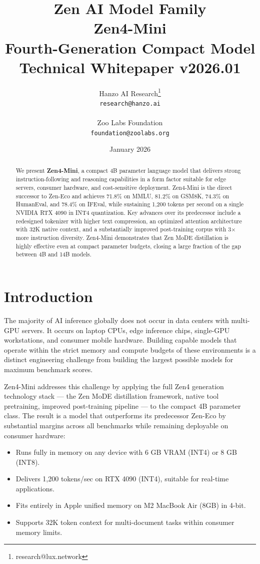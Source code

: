\documentclass[11pt,a4paper]{article}
\title{
    \vspace{-2cm}
    \Large \textbf{Zen AI Model Family} \\
    \vspace{0.5cm}
    \Huge \textbf{Zen4-Mini} \\
    \vspace{0.3cm}
    \large Fourth-Generation Compact Model \\
    \vspace{0.5cm}
    \normalsize Technical Whitepaper v2026.01
}
\author{
    Hanzo AI Research\thanks{research@lux.network} \\
    \texttt{research@hanzo.ai} \\
    \\
    Zoo Labs Foundation \\
    \texttt{foundation@zoolabs.org}
}
\date{January 2026}
\begin{document}
\maketitle

\begin{abstract}
We present \textbf{Zen4-Mini}, a compact 4B parameter language model that delivers strong
instruction-following and reasoning capabilities in a form factor suitable for edge servers,
consumer hardware, and cost-sensitive deployment. Zen4-Mini is the direct successor to
Zen-Eco and achieves 71.8\% on MMLU, 81.2\% on GSM8K, 74.3\% on HumanEval, and 78.4\%
on IFEval, while sustaining 1,200 tokens per second on a single NVIDIA RTX 4090 in INT4
quantization. Key advances over its predecessor include a redesigned tokenizer with
higher text compression, an optimized attention architecture with 32K native context, and
a substantially improved post-training corpus with 3$\times$ more instruction diversity.
Zen4-Mini demonstrates that Zen MoDE distillation is highly effective even at compact
parameter budgets, closing a large fraction of the gap between 4B and 14B models.
\end{abstract}

\tableofcontents
\newpage

\section{Introduction}

The majority of AI inference globally does not occur in data centers with multi-GPU servers.
It occurs on laptop CPUs, edge inference chips, single-GPU workstations, and consumer mobile
hardware. Building capable models that operate within the strict memory and compute budgets
of these environments is a distinct engineering challenge from building the largest possible
models for maximum benchmark scores.

Zen4-Mini addresses this challenge by applying the full Zen4 generation technology stack ---
the Zen MoDE distillation framework, native tool pretraining, improved post-training
pipeline --- to the compact 4B parameter class. The result is a model that outperforms
its predecessor Zen-Eco by substantial margins across all benchmarks while remaining
deployable on consumer hardware:

\begin{itemize}
    \item Runs fully in memory on any device with 6 GB VRAM (INT4) or 8 GB (INT8).
    \item Delivers 1,200 tokens/sec on RTX 4090 (INT4), suitable for real-time applications.
    \item Fits entirely in Apple unified memory on M2 MacBook Air (8GB) in 4-bit.
    \item Supports 32K token context for multi-document tasks within consumer memory limits.
\end{itemize}
\end{document}
